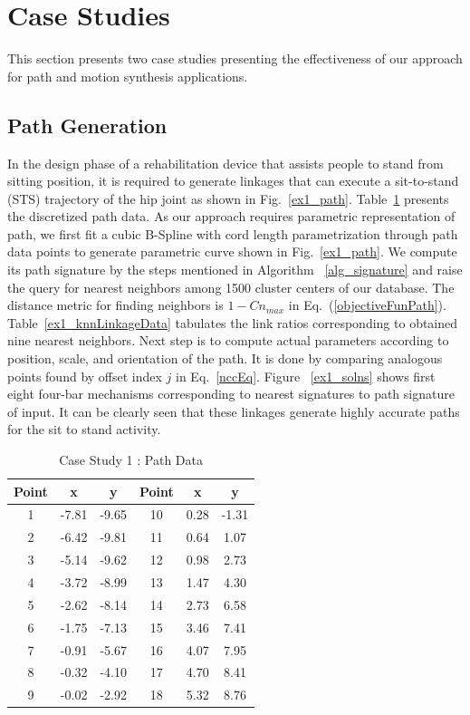 \documentclass[twocolumn,10pt]{asme2ej}
\newcommand{\req}[1]{(\ref{#1})}
\begin{document}
\section{Case Studies}\label{sec_example}
This section presents two case studies presenting the effectiveness of our approach for path and motion synthesis applications.
\subsection{Path Generation}
In the design phase of a rehabilitation device that assists people to stand from sitting position, it is required to generate linkages that can execute a sit-to-stand (STS) trajectory of the hip joint as shown in Fig.~\ref{ex1_path}.
Table~\ref{hipPathTab} presents the discretized path data.
As our approach requires parametric representation of path, we first fit a cubic B-Spline with cord length parametrization through path data points to generate parametric curve shown in Fig.~\ref{ex1_path}.
We compute its path signature by the steps mentioned in Algorithm ~\ref{alg_signature} and raise the query for nearest neighbors among 1500 cluster centers of our database.
The distance metric for finding neighbors is $1-Cn_{max}$ in Eq.~\req{objectiveFunPath}.
Table~\ref{ex1_knnLinkageData} tabulates the link ratios corresponding to obtained nine nearest neighbors.
Next step is to compute actual parameters according to position, scale, and orientation of the path.
It is done by comparing analogous points found by offset index $j$ in Eq.~\ref{nccEq}.
Figure ~\ref{ex1_solns} shows first eight four-bar mechanisms corresponding to nearest signatures to path signature of input.
It can be clearly seen that these linkages generate highly accurate paths for the sit to stand activity.

\begin{table}
\caption{Case Study 1 : Path Data}
\centering
\label{hipPathTab}
\begin{tabular}{cccccc}
\hline
Point & x & y & Point & x & y \\
\hline
1 & -7.81 & -9.65 & 10 & 0.28 & -1.31 \\
2 & -6.42 & -9.81 & 11 & 0.64 & 1.07 \\
3 & -5.14 & -9.62 & 12 & 0.98 & 2.73 \\
4 & -3.72 & -8.99 & 13 & 1.47 & 4.30 \\
5 & -2.62 & -8.14 & 14 & 2.73 & 6.58 \\
6 & -1.75 & -7.13 & 15 & 3.46 & 7.41 \\
7 & -0.91 & -5.67 & 16 & 4.07 & 7.95 \\
8 & -0.32 & -4.10 & 17 & 4.70 & 8.41 \\
9 & -0.02 & -2.92 & 18 & 5.32 & 8.76 \\
\end{tabular}
\end{table}
\end{document}
